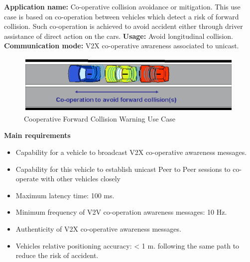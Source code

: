 \textbf{Application name:} Co-operative collision avoidance or mitigation.
 This use case is based on co-operation between vehicles which detect a risk of forward collision.
Such co-operation is achieved to avoid accident either through driver assistance of direct action on the cars.
\textbf{Usage:} Avoid longitudinal collision.
\textbf{Communication mode:} V2X co-operative awareness associated to unicast.
\begin{figure}[htbp]
\includegraphics[width=0.99\textwidth]{content/images/06_use_cases/colissionwarning.png}
\caption{Cooperative Forward Collision Warning Use Case}
\label{fig:cfcw}
\end{figure}
\textbf{Main requirements}
\begin{itemize}
\item Capability for a vehicle to broadcast V2X co-operative awareness messages.
\item Capability for this vehicle to establish unicast Peer to Peer sessions to co-operate with other vehicles closely
\item Maximum latency time: 100 ms.
\item Minimum frequency of V2V co-operation awareness messages: 10 Hz.
\item Authenticity of V2X co-operative awareness messages.
\item Vehicles relative positioning accuracy: < 1 m.
following the same path to reduce the risk of accident.
\end{itemize}

